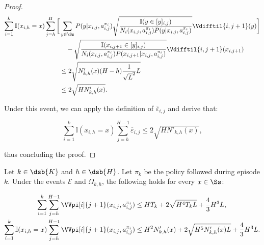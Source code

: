 \begin{proof}
\begin{align*}
    \sum_{i=1}^k \mathbb{I}(x_{i,h}=x) \sum_{j=h}^H \bigg[ &\sum_{y\in\Ss} P(y|x_{i,j},a_{i,j}^{\pi_i}) \sqrt{\frac{\mathbb{I}(y \in [y]_{i,j})}{N_i(x_{i,j},a_{i,j}^{\pi_i})P(y|x_{i,j},a_{i,j}^{\pi_i})}} \Vdifftil{i,j+1}(y) \bigg] \\
    &\quad - \sqrt{\frac{\mathbb{I}(x_{i,j+1} \in [y]_{i,j})}{N_i(x_{i,j},a_{i,j}^{\pi_i})P(x_{i,j+1}|x_{i,j},a_{i,j}^{\pi_i})}} \Vdifftil{i,j+1}(x_{i,j+1}) \\
    &\le 2 \sqrt{N'_{k,h}(x) (H-h) \frac{1}{\sqrt{L}^2} L} \\
    &\le 2 \sqrt{H N'_{k,h}(x)}.
\end{align*}

Under this event, we can apply the definition of $\overline{\varepsilon}_{i,j}$ and derive that:

\begin{equation*}
    \sum_{i=1}^k \mathbb{I}(x_{i,h}=x) \sum_{j=h}^{H-1} \overline{\varepsilon}_{i,j} \le 2 \sqrt{H N'_{k,h}(x)},
\end{equation*}

thus concluding the proof.

\end{proof}


\begin{lemma}
\label{lem:sum_next_state_var}
Let $k \in \dsb{K}$ and $h \in \dsb{H}$. Let $\pi_k$ be the policy followed during episode $k$. Under the events $\mathcal{E}$ and $\Omega_{k,h}$, the following holds for every $x \in \Ss$:

\begin{align*}
    \sum_{i=1}^k \sum_{j=h}^{H-1} \VVpi[i]{j+1} (x_{i,j}, a_{i,j}^{\pi_i}) &\le HT_k + 2\sqrt{H^4 T_k L} + \frac{4}{3}H^3L, \\
    \sum_{i=1}^k \mathbb{I}(x_{i,h}=x) \sum_{j=h}^{H-1} \VVpi[i]{j+1} (x_{i,j}, a_{i,j}^{\pi_i}) &\le H^2 N'_{k,h}(x) + 2 \sqrt{H^5 N'_{k,h}(x) L} + \frac{4}{3} H^3 L.
\end{align*}
\end{lemma}


